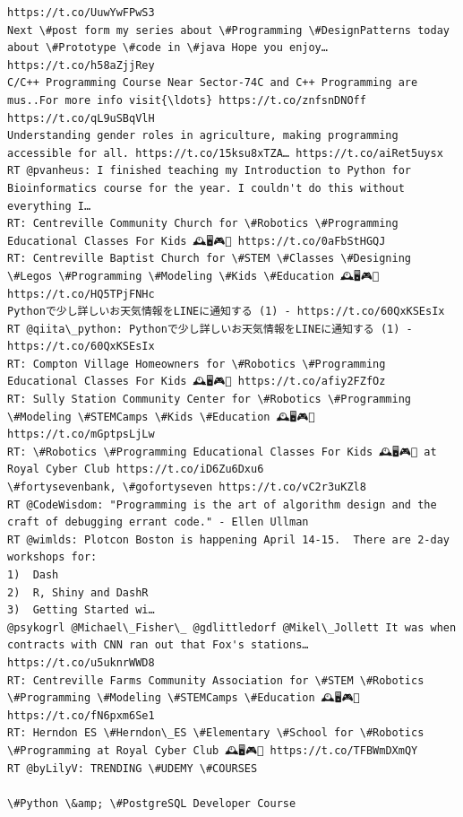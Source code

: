 \documentclass[11pt]{article}
\begin{document}
\begin{Verbatim}[commandchars=\\\{\}]
https://t.co/UuwYwFPwS3
Next \#post form my series about \#Programming \#DesignPatterns today about \#Prototype \#code in \#java Hope you enjoy… https://t.co/h58aZjjRey
C/C++ Programming Course Near Sector-74C and C++ Programming are mus..For more info visit{\ldots} https://t.co/znfsnDNOff https://t.co/qL9uSBqVlH
Understanding gender roles in agriculture, making programming accessible for all. https://t.co/15ksu8xTZA… https://t.co/aiRet5uysx
RT @pvanheus: I finished teaching my Introduction to Python for Bioinformatics course for the year. I couldn't do this without everything I…
RT: Centreville Community Church for \#Robotics \#Programming Educational Classes For Kids 🕰️🖥️🎮💎 https://t.co/0aFbStHGQJ
RT: Centreville Baptist Church for \#STEM \#Classes \#Designing \#Legos \#Programming \#Modeling \#Kids \#Education 🕰️🖥️🎮💎 https://t.co/HQ5TPjFNHc
Pythonで少し詳しいお天気情報をLINEに通知する (1) - https://t.co/60QxKSEsIx
RT @qiita\_python: Pythonで少し詳しいお天気情報をLINEに通知する (1) - https://t.co/60QxKSEsIx
RT: Compton Village Homeowners for \#Robotics \#Programming Educational Classes For Kids 🕰️🖥️🎮💎 https://t.co/afiy2FZfOz
RT: Sully Station Community Center for \#Robotics \#Programming \#Modeling \#STEMCamps \#Kids \#Education 🕰️🖥️🎮💎 https://t.co/mGptpsLjLw
RT: \#Robotics \#Programming Educational Classes For Kids 🕰️🖥️🎮💎 at Royal Cyber Club https://t.co/iD6Zu6Dxu6
\#fortysevenbank, \#gofortyseven https://t.co/vC2r3uKZl8
RT @CodeWisdom: "Programming is the art of algorithm design and the craft of debugging errant code." - Ellen Ullman
RT @wimlds: Plotcon Boston is happening April 14-15.  There are 2-day workshops for:
1)  Dash
2)  R, Shiny and DashR
3)  Getting Started wi…
@psykogrl @Michael\_Fisher\_ @gdlittledorf @Mikel\_Jollett It was when contracts with CNN ran out that Fox's stations… https://t.co/u5uknrWWD8
RT: Centreville Farms Community Association for \#STEM \#Robotics \#Programming \#Modeling \#STEMCamps \#Education 🕰️🖥️🎮💎 https://t.co/fN6pxm6Se1
RT: Herndon ES \#Herndon\_ES \#Elementary \#School for \#Robotics \#Programming at Royal Cyber Club 🕰️🖥️🎮💎 https://t.co/TFBWmDXmQY
RT @byLilyV: TRENDING \#UDEMY \#COURSES

\#Python \&amp; \#PostgreSQL Developer Course


\end{Verbatim}
\end{document}

